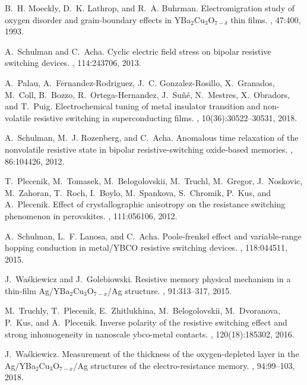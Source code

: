 \documentclass[square,aip,preprint,showkeys,superscriptaddress]{revtex4}
\begin{document}
\begin{thebibliography}{10}
	B.~H. Moeckly, D.~K. Lathrop, and R.~A. Buhrman.
	\newblock Electromigration study of oxygen disorder and grain-boundary effects
	in {YBa$_2$Cu$_3$O$_{7-\delta}$} thin films.
	, 47:400, 1993.
	
	A.~Schulman and C.~Acha.
	\newblock Cyclic electric field stress on bipolar resistive switching devices.
	, 114:243706, 2013.
	
	A.~Palau, A.~Fernandez-Rodriguez, J.~C. Gonzalez-Rosillo, X.~Granados, M.~Coll,
	B.~Bozzo, R.~Ortega-Hernandez, J.~Suñé, N.~Mestres, X.~Obradors, and T.~Puig.
	\newblock Electrochemical tuning of metal insulator transition and non-volatile
	resistive switching in superconducting films.
	, 10(36):30522--30531, 2018.
	
	A.~Schulman, M.~J. Rozenberg, and C.~Acha.
	\newblock Anomalous time relaxation of the nonvolatile resistive state in
	bipolar resistive-switching oxide-based memories.
	, 86:104426, 2012.
	
	T.~Plecenik, M.~Tomasek, M.~Belogolovskii, M.~Truchl, M.~Gregor, J.~Noskovic,
	M.~Zahoran, T.~Roch, I.~Boylo, M.~Spankova, S.~Chromik, P.~Kus, and
	A.~Plecenik.
	\newblock Effect of crystallographic anisotropy on the resistance switching
	phenomenon in perovskites.
	, 111:056106, 2012.
	
	A.~Schulman, L.~F. Lanosa, and C.~Acha.
	\newblock Poole-frenkel effect and variable-range hopping conduction in
	metal/{YBCO} resistive switching devices.
	, 118:044511, 2015.
	
	J.~Wa\'skiewicz and J.~Golebiowski.
	\newblock Resistive memory physical mechanism in a thin-film
	{Ag/YBa$_2$Cu$_3$O$_{7-x}$/Ag} structure.
	, 91:313--317, 2015.
	
	M.~Truchly, T.~Plecenik, E.~Zhitlukhina, M.~Belogolovskii, M.~Dvoranova,
	P.~Kus, and A.~Plecenik.
	\newblock Inverse polarity of the resistive switching effect and strong
	inhomogeneity in nanoscale ybco-metal contacts.
	, 120(18):185302, 2016.
	
	J.~Wa\'skiewicz.
	\newblock Measurement of the thickness of the oxygen-depleted layer in the
	{Ag/YBa$_2$Cu$_3$O$_{7-x}$/Ag} structures of the electro-resistance memory.
	, 94:99--103, 2018.
	

\end{thebibliography}
\end{document}

